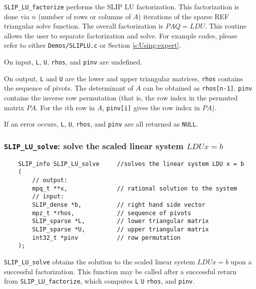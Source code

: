 \documentclass[12pt]{article}
\theoremstyle{definition}
\begin{document}
\verb|SLIP_LU_factorize| performs the SLIP LU factorization. This factorization
is done via $n$ (number of rows or columns of $A$) iterations of the sparse
REF triangular solve function. The overall factorization is $PAQ = LDU$.  This
routine allows the user to separate factorization and solve. For example codes,
please refer to either \verb|Demos/SLIPLU.c| or Section \ref{s:Using:expert}.

On input, \verb|L|, \verb|U|, \verb|rhos|, and \verb|pinv| are undefined.

On output, \verb|L| and \verb|U| are the lower and upper triangular matrices,
\verb|rhos| contains the sequence of pivots. The determinant of $A$ can be
obtained as \verb|rhos[n-1]|. \verb|pinv| contains the inverse row permutation
(that is, the row index in the permuted matrix $PA$. For the $i$th row in $A$,
\verb|pinv[i]| gives the row index in $PA$).

If an error occurs, \verb|L|, \verb|U|, \verb|rhos|, and \verb|pinv| are all
returned as \verb|NULL|.

\cprotect\subsubsection{\verb|SLIP_LU_solve|: solve the scaled linear system $LDUx=b$}
\label{ss:SLIP_LU_solve}


\begin{mdframed}[userdefinedwidth=6in]
{\footnotesize
\begin{verbatim}
    SLIP_info SLIP_LU_solve     //solves the linear system LDU x = b
    (
        // output:
        mpq_t **x,              // rational solution to the system
        // input:
        SLIP_dense *b,          // right hand side vector
        mpz_t *rhos,            // sequence of pivots
        SLIP_sparse *L,         // lower triangular matrix
        SLIP_sparse *U,         // upper triangular matrix
        int32_t *pinv           // row permutation
    );
\end{verbatim}
} \end{mdframed}

\verb|SLIP_LU_solve| obtains the solution to the scaled linear system $LDUx=b$
upon a successful factorization.  This function may be called after a
successful return from \verb|SLIP_LU_factorize|, which computes \verb|L|
\verb|U| \verb|rhos|, and \verb|pinv|. 
\end{document}
